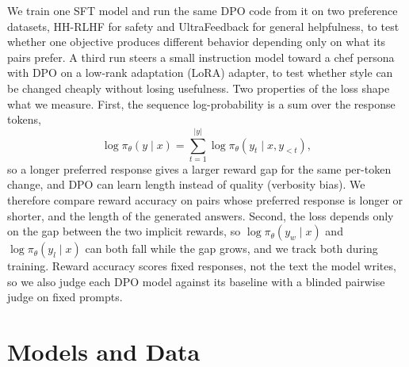 \documentclass{article}
\begin{document}
We train one SFT model and run the same DPO code from it on two preference datasets, HH-RLHF for safety and UltraFeedback for general helpfulness, to test whether one objective produces different behavior depending only on what its pairs prefer. A third run steers a small instruction model toward a chef persona with DPO on a low-rank adaptation (LoRA) adapter, to test whether style can be changed cheaply without losing usefulness. Two properties of the loss shape what we measure. First, the sequence log-probability is a sum over the response tokens,
\begin{equation*}
  \log\pi_\theta(y\mid x)=\sum_{t=1}^{|y|}\log\pi_\theta(y_t\mid x,y_{<t}),
\end{equation*}
so a longer preferred response gives a larger reward gap for the same per-token change, and DPO can learn length instead of quality (verbosity bias). We therefore compare reward accuracy on pairs whose preferred response is longer or shorter, and the length of the generated answers. Second, the loss depends only on the gap between the two implicit rewards, so $\log\pi_\theta(y_w\mid x)$ and $\log\pi_\theta(y_l\mid x)$ can both fall while the gap grows, and we track both during training. Reward accuracy scores fixed responses, not the text the model writes, so we also judge each DPO model against its baseline with a blinded pairwise judge on fixed prompts.

\section{Models and Data}
\label{sec:data}
\end{document}
